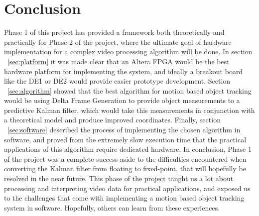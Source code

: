 \documentclass[12pt]{article} %
\begin{document}
\section{Conclusion}
Phase 1 of this project has provided a framework both theoretically and practically for Phase 2 of the project, where the ultimate goal of hardware implementation for a complex video processing algorithm will be done. In section ~\ref{sec:platform} it was made clear that an Altera FPGA would be the best hardware platform for implementing the system, and ideally a breakout board like the DE1 or DE2 would provide easier prototype development. Section ~\ref{sec:algorithm} showed that the best algorithm for motion based object tracking would be using Delta Frame Generation to provide object measurements to a predictive Kalman filter, which would take this measurements in conjunction with a theoretical model and produce improved coordinates. Finally, section ~\ref{sec:software} described the process of implementing the chosen algorithm in software, and proved from the extremely slow execution time that the practical applications of this algorithm require dedicated hardware. In conclusion, Phase 1 of the project was a complete success aside to the difficulties encountered when converting the Kalman filter from floating to fixed-point, that will hopefully be resolved in the near future. This phase of the project taught us a lot about processing and interpreting video data for practical applications, and exposed us to the challenges that come with implementing a motion based object tracking system in software. Hopefully, others can learn from these experiences. 
\newpage
\end{document}
